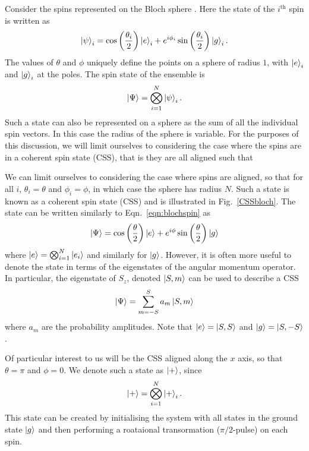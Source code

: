 \documentclass{article}
\begin{document}
Consider the spins represented on the Bloch sphere \cite{Cox2016}. Here the
state of the $i^\text{th}$ spin is written as
%
\begin{equation}
  \ket{\psi}_i = \cos\left(\frac{\theta_i}{2}\right)\ket{e}_i +
  e^{i\phi_i}\sin\left(\frac{\theta_i}{2}\right)\ket{g}_i.
  \label{eqn:blochspin}
\end{equation}
%
The values of $\theta$ and $\phi$ uniquely define the points on a sphere of
radius $1$, with $\ket{e}_i$ and $\ket{g}_i$ at the poles. The spin state of
the ensemble is
%
\begin{equation}
  \ket{\Psi} = \bigotimes_{i=1}^N \ket{\psi}_i.
\end{equation}
Such a state can also be represented on a sphere as the sum of all the
individual spin vectors. In this case the radius of the sphere is variable. For
the purposes of this discussion, we will limit ourselves to considering the
case where the spins are in a coherent spin state (CSS), that is they are all
aligned such that 

We can limit ourselves to considering the case where spins are aligned,
so that for all $i$, $\theta_i = \theta$ and $\phi_i = \phi$, in which case the
sphere has radius $N$. Such a state is known as a coherent spin state (CSS) and
is illustrated in Fig.~\ref{CSSbloch}. The state can be written similarly to
Eqn.~\ref{eqn:blochspin} as
%
\begin{equation}
  \ket{\Psi} = \cos\left(\frac{\theta}{2}\right)\ket{e} +
  e^{i\phi}\sin\left(\frac{\theta}{2}\right)\ket{g}
\end{equation}
%
where $\ket{e} = \bigotimes_{i=1}^N\ket{e_i}$ and similarly for $\ket{g}$.
However, it is often more useful to denote the state in terms of the
eigenstates of the angular momentum operator. In particular, the eigenstate of
$S_z$, denoted $\ket{S, m}$ can be used to describe a CSS
%
\begin{equation}
  \ket{\Psi} = \sum_{m=-S}^S a_m \ket{S, m}
\end{equation}
where $a_m$ are the probability amplitudes. Note that $\ket{e} = \ket{S, S}$
and $\ket{g} = \ket{S, -S}$.

Of particular interest to us will be the CSS aligned along the $x$ axis, so
that $\theta = \pi$ and $\phi = 0$. We denote such a state as $\ket{+}$, since
%
\begin{equation}
  \ket{+} = \bigotimes_{i=1}^N \ket{+}_i.
\end{equation}
%
This state can be created by initialising the system with all states in the
ground state $\ket{g}$ and then performing a roataional transormation
($\pi/2$-pulse) on each spin.
\end{document}
